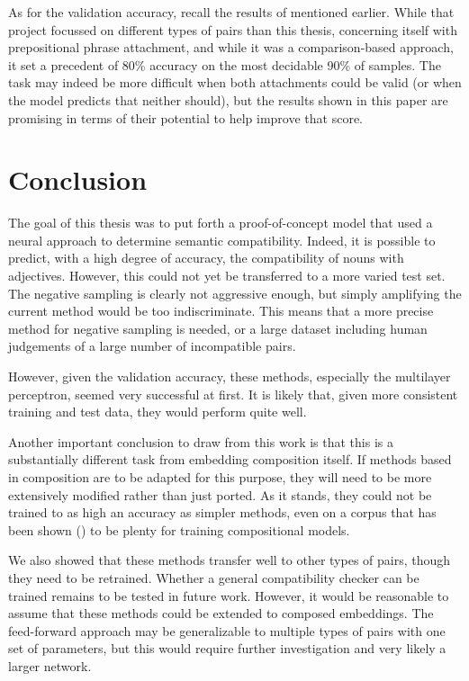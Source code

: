 \documentclass[a4paper, 12pt]{article}
\begin{document}
As for the validation accuracy, recall the results of \cite{Volk} mentioned earlier. While that project focussed on different types of pairs than this thesis, concerning itself with prepositional phrase attachment, and while it was a comparison-based approach, it set a precedent of 80\% accuracy on the most decidable 90\% of samples. The task may indeed be more difficult when both attachments could be valid (or when the model predicts that neither should), but the results shown in this paper are promising in terms of their potential to help improve that score.


\section{Conclusion}
The goal of this thesis was to put forth a proof-of-concept model that used a neural approach to determine semantic compatibility. Indeed, it is possible to predict, with a high degree of accuracy, the compatibility of nouns with adjectives. However, this could not yet be transferred to a more varied test set. The negative sampling is clearly not aggressive enough, but simply amplifying the current method would be too indiscriminate. This means that a more precise method for negative sampling is needed, or a large dataset including human judgements of a large number of incompatible pairs.

However, given the validation accuracy, these methods, especially the multilayer perceptron, seemed very successful at first. It is likely that, given more consistent training and test data, they would perform quite well.

Another important conclusion to draw from this work is that this is a substantially different task from embedding composition itself. If methods based in composition are to be adapted for this purpose, they will need to be more extensively modified rather than just ported. As it stands, they could not be trained to as high an accuracy as simpler methods, even on a corpus that has been shown (\cite{TSelect}) to be plenty for training compositional models.

We also showed that these methods transfer well to other types of pairs, though they need to be retrained. Whether a general compatibility checker can be trained remains to be tested in future work. However, it would be reasonable to assume that these methods could be extended to composed embeddings. The feed-forward approach may be generalizable to multiple types of pairs with one set of parameters, but this would require further investigation and very likely a larger network.
\end{document}
